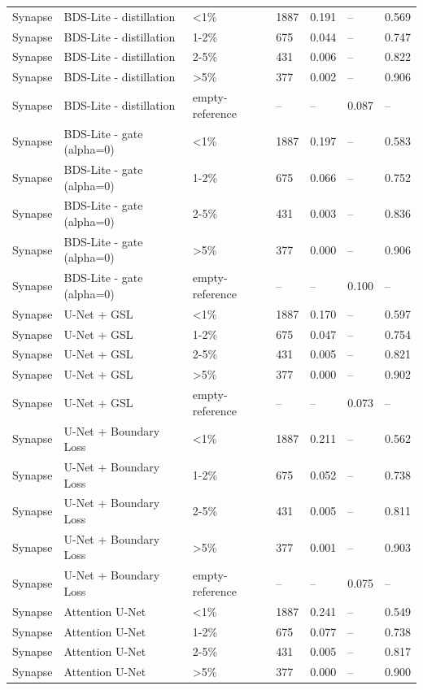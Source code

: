 \begin{tabular}{lllllll}
Synapse & BDS-Lite - distillation & <1\% & 1887 & 0.191 & -- & 0.569 \\
Synapse & BDS-Lite - distillation & 1-2\% & 675 & 0.044 & -- & 0.747 \\
Synapse & BDS-Lite - distillation & 2-5\% & 431 & 0.006 & -- & 0.822 \\
Synapse & BDS-Lite - distillation & >5\% & 377 & 0.002 & -- & 0.906 \\
Synapse & BDS-Lite - distillation & empty-reference & -- & -- & 0.087 & -- \\
Synapse & BDS-Lite - gate (alpha=0) & <1\% & 1887 & 0.197 & -- & 0.583 \\
Synapse & BDS-Lite - gate (alpha=0) & 1-2\% & 675 & 0.066 & -- & 0.752 \\
Synapse & BDS-Lite - gate (alpha=0) & 2-5\% & 431 & 0.003 & -- & 0.836 \\
Synapse & BDS-Lite - gate (alpha=0) & >5\% & 377 & 0.000 & -- & 0.906 \\
Synapse & BDS-Lite - gate (alpha=0) & empty-reference & -- & -- & 0.100 & -- \\
Synapse & U-Net + GSL & <1\% & 1887 & 0.170 & -- & 0.597 \\
Synapse & U-Net + GSL & 1-2\% & 675 & 0.047 & -- & 0.754 \\
Synapse & U-Net + GSL & 2-5\% & 431 & 0.005 & -- & 0.821 \\
Synapse & U-Net + GSL & >5\% & 377 & 0.000 & -- & 0.902 \\
Synapse & U-Net + GSL & empty-reference & -- & -- & 0.073 & -- \\
Synapse & U-Net + Boundary Loss & <1\% & 1887 & 0.211 & -- & 0.562 \\
Synapse & U-Net + Boundary Loss & 1-2\% & 675 & 0.052 & -- & 0.738 \\
Synapse & U-Net + Boundary Loss & 2-5\% & 431 & 0.005 & -- & 0.811 \\
Synapse & U-Net + Boundary Loss & >5\% & 377 & 0.001 & -- & 0.903 \\
Synapse & U-Net + Boundary Loss & empty-reference & -- & -- & 0.075 & -- \\
Synapse & Attention U-Net & <1\% & 1887 & 0.241 & -- & 0.549 \\
Synapse & Attention U-Net & 1-2\% & 675 & 0.077 & -- & 0.738 \\
Synapse & Attention U-Net & 2-5\% & 431 & 0.005 & -- & 0.817 \\
Synapse & Attention U-Net & >5\% & 377 & 0.000 & -- & 0.900 \\

\end{tabular}
